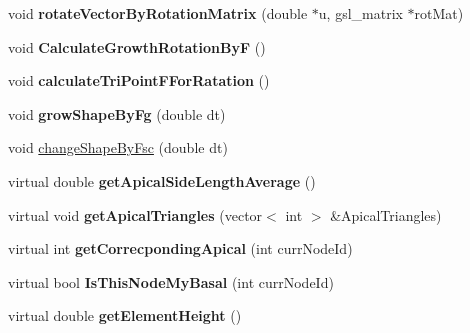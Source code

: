 \begin{DoxyCompactItemize}
\item 
\hypertarget{classShapeBase_a14a573072213ea91314c8f1101f106bb}{}void {\bfseries rotate\+Vector\+By\+Rotation\+Matrix} (double $\ast$u, gsl\+\_\+matrix $\ast$rot\+Mat)\label{classShapeBase_a14a573072213ea91314c8f1101f106bb}

\item 
\hypertarget{classShapeBase_a9ae4c5fc8817528493502e3f75c9a984}{}void {\bfseries Calculate\+Growth\+Rotation\+By\+F} ()\label{classShapeBase_a9ae4c5fc8817528493502e3f75c9a984}

\item 
\hypertarget{classShapeBase_a5f5e95f38f271d28f2856109b0256aa0}{}void {\bfseries calculate\+Tri\+Point\+F\+For\+Ratation} ()\label{classShapeBase_a5f5e95f38f271d28f2856109b0256aa0}

\item 
\hypertarget{classShapeBase_aa83e1b27ea3a67b958afd06f9095e0de}{}void {\bfseries grow\+Shape\+By\+Fg} (double dt)\label{classShapeBase_aa83e1b27ea3a67b958afd06f9095e0de}

\item 
void \hyperlink{classShapeBase_a5409de18ee9e47af0bb977f4a1e608fb}{change\+Shape\+By\+Fsc} (double dt)
\item 
\hypertarget{classShapeBase_a6d8088a8bb897d79a796a253c06d954f}{}virtual double {\bfseries get\+Apical\+Side\+Length\+Average} ()\label{classShapeBase_a6d8088a8bb897d79a796a253c06d954f}

\item 
\hypertarget{classShapeBase_a440ec12735963373a1e90922c0b57bac}{}virtual void {\bfseries get\+Apical\+Triangles} (vector$<$ int $>$ \&Apical\+Triangles)\label{classShapeBase_a440ec12735963373a1e90922c0b57bac}

\item 
\hypertarget{classShapeBase_ac210b3828c14aa394e6e2222617ddcfa}{}virtual int {\bfseries get\+Correcponding\+Apical} (int curr\+Node\+Id)\label{classShapeBase_ac210b3828c14aa394e6e2222617ddcfa}

\item 
\hypertarget{classShapeBase_abc13c22e407ba29384b0995a55f32463}{}virtual bool {\bfseries Is\+This\+Node\+My\+Basal} (int curr\+Node\+Id)\label{classShapeBase_abc13c22e407ba29384b0995a55f32463}

\item 
\hypertarget{classShapeBase_a995a5e6a553ed0cdaadf74dab4f88822}{}virtual double {\bfseries get\+Element\+Height} ()\label{classShapeBase_a995a5e6a553ed0cdaadf74dab4f88822}


\end{DoxyCompactItemize}
